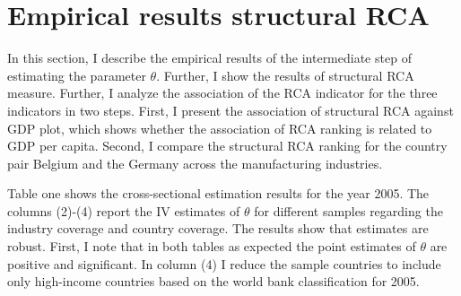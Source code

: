 \section{Empirical results structural RCA}
\label{sec:cross-section}
In this section, I describe the empirical results of the intermediate step of estimating the parameter $\theta$.
Further, I show the results of structural RCA measure.
Further, I analyze the association of the RCA indicator for the three indicators in two steps.
  First, I present the association of structural RCA against GDP plot, which shows whether the association of RCA ranking is related to GDP per capita.
Second, I compare the structural RCA ranking for the country pair Belgium and the Germany across the manufacturing industries.
\par
Table one shows the cross-sectional estimation results for the year 2005.
The columns (2)-(4) report the IV estimates of $\theta$  for different samples regarding the industry coverage and country coverage.
The results show that estimates are robust.
 First, I note that in both tables as expected the point estimates of $\theta$ are positive and significant.
In column (4) I reduce the sample countries to include only high-income countries based on the world bank classification for 2005.
